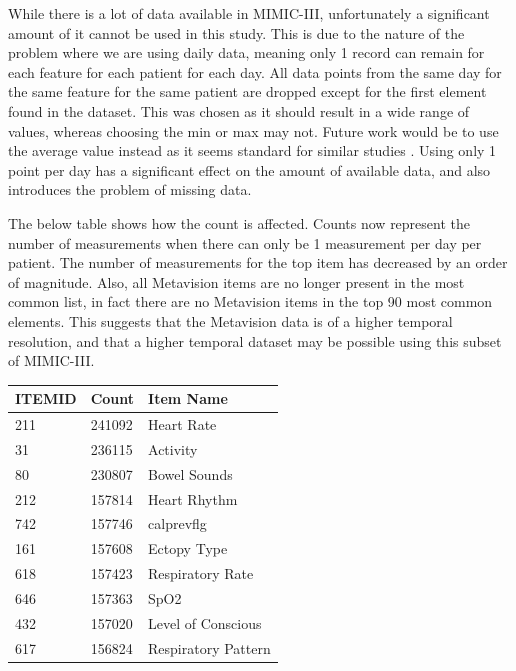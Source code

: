 \documentclass[12pt]{article}
\begin{document}
While there is a lot of data available in MIMIC-III, unfortunately a significant amount of it cannot be used in this study. This is due to the nature of the problem where we are using daily data, meaning only 1 record can remain for each feature for each patient for each day.  All data points from the same day for the same feature for the same patient are dropped except for the first element found in the dataset. This was chosen as it should result in a wide range of values, whereas choosing the min or max may not. Future work would be to use the average value instead as it seems standard for similar studies \cite{KajiLSTM,ICUBidirectionalLSTM}. Using only 1 point per day has a significant effect on the amount of available data, and also introduces the problem of missing data.

The below table shows how the count is affected. Counts now represent the number of measurements when there can only be 1 measurement per day per patient. The number of measurements for the top item has decreased by an order of magnitude. Also, all Metavision items are no longer present in the most common list, in fact there are no Metavision items in the top 90 most common elements. This suggests that the Metavision data is of a higher temporal resolution, and that a higher temporal dataset may be possible using this subset of MIMIC-III.

\begin{center}
\captionsetup{type=table}
\begin{tabular}{|l|l|l|}
\hline
ITEMID & Count  & Item Name           \\ \hline
211    & 241092 & Heart Rate          \\ \hline
31     & 236115 & Activity            \\ \hline
80     & 230807 & Bowel Sounds        \\ \hline
212    & 157814 & Heart Rhythm        \\ \hline
742    & 157746 & calprevflg          \\ \hline
161    & 157608 & Ectopy Type         \\ \hline
618    & 157423 & Respiratory Rate    \\ \hline
646    & 157363 & SpO2                \\ \hline
432    & 157020 & Level of Conscious  \\ \hline
617    & 156824 & Respiratory Pattern \\ \hline
\end{tabular}
\label{Most Common Items (Once per Day per Patient)}
\end{center}
\end{document}
